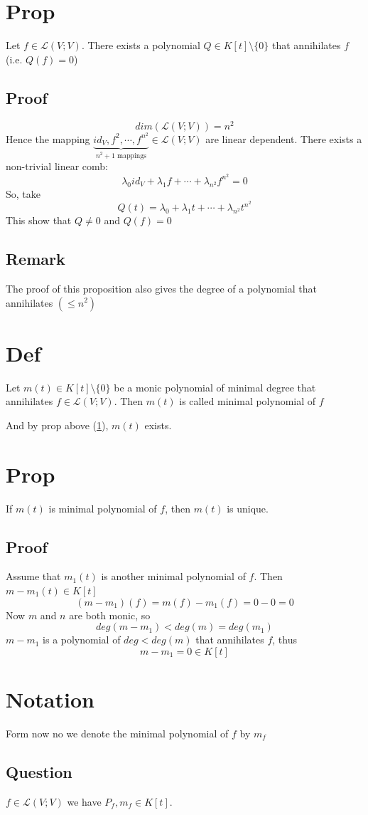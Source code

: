 \documentclass{book}
\begin{document}
\section{Prop}
\label{Prop.48.17}
Let $f\in \mathscr{L}(V;V)$. There exists a polynomial $Q\in K[t]\setminus\{0\}$ that annihilates $f$ (i.e. $Q(f)=0$)
\subsection*{Proof}
$$dim(\mathscr{L}(V;V))=n^2$$
Hence the mapping $\underbrace{id_V,f^2,\cdots,f^{n^2}}\limits_{n^2+1\text{ mappings}}\in\mathscr{L}(V;V)$ are linear dependent. There exists a non-trivial linear comb:
$$\lambda_0id_V+\lambda_1f+\cdots+\lambda_{n^2}f^{n^2}=0$$
So, take $$Q(t)=\lambda_0+\lambda_1t+\cdots+\lambda_{n^2}t^{n^2}$$ This show that $Q\neq0$ and $Q(f)=0$
\subsection*{Remark}The proof of this proposition also gives the degree of a polynomial that annihilates $(\leq n^2)$
\section{Def}
Let $m(t)\in K[t]\setminus\{0\}$ be a monic polynomial of minimal degree that annihilates $f\in \mathscr{L}(V;V)$. Then $m(t)$ is called minimal polynomial of $f$

And by prop above (\ref{Prop.48.17}), $m(t)$ exists.
\section{Prop}
If $m(t)$ is minimal polynomial of $f$, then $m(t)$ is unique.
\subsection*{Proof}
Assume that $m_1(t)$ is another minimal polynomial of $f$. Then $m-m_1(t)\in K[t]$
$$(m-m_1)(f)=m(f)-m_1(f)=0-0=0$$
Now $m$ and $n$ are both monic, so $$deg(m-m_1)<deg(m)=deg(m_1)$$
$m-m_1$ is a polynomial of $deg<deg(m)$ that annihilates $f$, thus $$m-m_1=0\in K[t]$$
\section*{Notation}
Form now no we denote the minimal polynomial of $f$ by $m_f$
\subsection*{Question}
$f\in\mathscr{L}(V;V)$ we have $P_f,m_f\in K[t]$.
\end{document}
